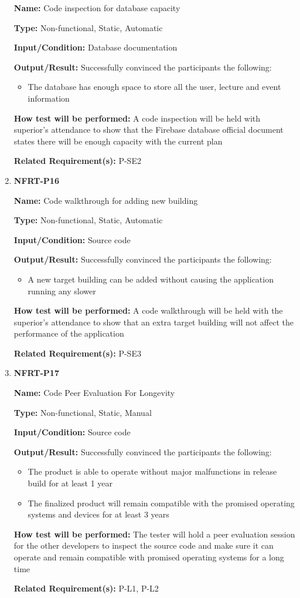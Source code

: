 \documentclass[12pt, titlepage]{article}
\begin{document}
\begin{enumerate}
\textbf{Name:} Code inspection for database capacity

\textbf{Type:} Non-functional, Static, Automatic

\textbf{Input/Condition:} Database documentation

\textbf{Output/Result:} Successfully convinced the participants the following:
\begin{itemize}
\item The database has enough space to store all the user, lecture and event information
\end{itemize}

\textbf{How test will be performed:} A code inspection will be held with superior's attendance to show that the Firebase database official document states there will be enough capacity with the current plan

\textbf{Related Requirement(s):} P-SE2

\item{\textbf{NFRT-P16}}

\textbf{Name:} Code walkthrough for adding new building

\textbf{Type:} Non-functional, Static, Automatic

\textbf{Input/Condition:} Source code

\textbf{Output/Result:} Successfully convinced the participants the following:
\begin{itemize}
\item A new target building can be added without causing the application running any slower
\end{itemize}

\textbf{How test will be performed:} A code walkthrough will be held with the superior's attendance to show that an extra target building will not affect the performance of the application

\textbf{Related Requirement(s):} P-SE3

\item{\textbf{NFRT-P17}}

\textbf{Name:} Code Peer Evaluation For Longevity

\textbf{Type:} Non-functional, Static, Manual

\textbf{Input/Condition:} Source code

\textbf{Output/Result:} Successfully convinced the participants the following:
\begin{itemize} 
  \item The product is able to operate without major malfunctions in release build for at least 1 year
  \item The finalized product will remain compatible with the promised operating systems and devices for at least 3 years
\end{itemize}

\textbf{How test will be performed:} The tester will hold a peer evaluation session for the other developers to inspect the source code and make sure it can operate and remain compatible with promised operating systems for a long time

\textbf{Related Requirement(s):} P-L1, P-L2
\end{enumerate}
\end{document}
